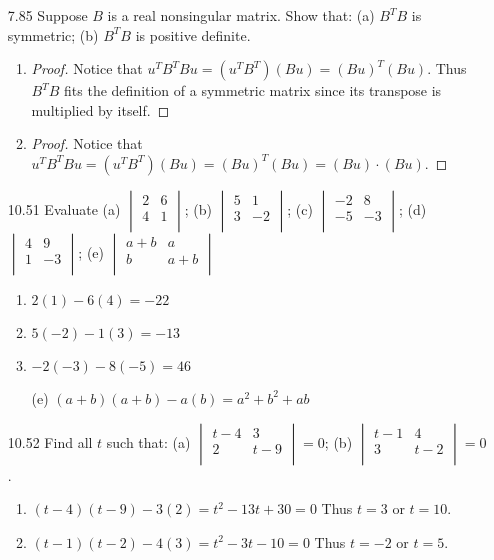 \documentclass[12pt]{article}
\theoremstyle{definition}
\theoremstyle{plain}
\begin{document}
\begin{enumerate}
\item[7.85]Suppose $B$ is a real nonsingular matrix. Show that: (a) $B^TB$ is symmetric; (b) $B^TB$ is positive definite.
	\begin{enumerate}
	\item
	\begin{proof}
		Notice that $u^TB^TBu = (u^TB^T)(Bu) = (Bu)^T(Bu)$. Thus $B^TB$ fits the definition of a symmetric matrix since its transpose is multiplied by itself.
	\end{proof}
	\item
	\begin{proof}
		Notice that $u^TB^TBu = (u^TB^T)(Bu) = (Bu)^T(Bu) = (Bu)\cdot (Bu)$. 	
	\end{proof}
	\end{enumerate}

\item[10.51]Evaluate (a) $\begin{vmatrix}2&6\\4&1\\\end{vmatrix}$; (b) $\begin{vmatrix}5&1\\3&-2\\\end{vmatrix}$; (c) $\begin{vmatrix}-2&8\\-5&-3\\\end{vmatrix}$; (d) $\begin{vmatrix}4&9\\1&-3\\\end{vmatrix}$; (e) $\begin{vmatrix}a+b&a\\b&a+b\\\end{vmatrix}$
	\begin{enumerate}
	\item $2(1)-6(4) = -22$
	\item $5(-2)-1(3) = -13$
	\item $-2(-3)-8(-5) = 46$
	\item[(e)] $(a+b)(a+b)-a(b) = a^2+b^2+ab$
	\end{enumerate}

\item[10.52]Find all $t$ such that: (a) $\begin{vmatrix}t-4&3\\2&t-9\\\end{vmatrix} = 0$; (b) $\begin{vmatrix}t-1&4\\3&t-2\\\end{vmatrix} = 0$.
	\begin{enumerate}
	\item $(t-4)(t-9)-3(2) = t^2-13t+30 = 0$ Thus $t=3$ or $t=10$.
	\item $(t-1)(t-2)-4(3) = t^2-3t-10 = 0$ Thus $t=-2$ or $t=5$.
	\end{enumerate}


\end{enumerate}
\end{document}
